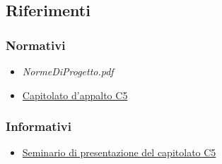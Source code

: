 \documentclass[../piano-di-qualifica.tex]{subfiles}
\begin{document}
\subsection{Riferimenti}%
\label{sub:riferimenti}
\subsubsection{Normativi}%
\label{par:normativi}
\begin{itemize}
  \item \textit{NormeDiProgetto.pdf}
  \item \href{https://www.math.unipd.it/~tullio/IS-1/2019/Progetto/C5.pdf}{Capitolato d'appalto C5}
\end{itemize}
\subsubsection{Informativi}%
\label{par:informativi}
\begin{itemize}
  \item \href{https://www.math.unipd.it/~tullio/IS-1/2019/Dispense/C5a.pdf}{Seminario di presentazione del capitolato C5}
\end{itemize}
\end{document}
